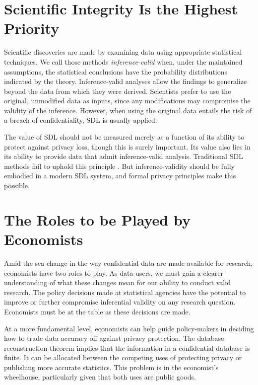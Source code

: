 \documentclass[dvipsnames,finalmode,PP]{AEA}
\begin{document}
\section{Scientific Integrity Is the Highest Priority}

Scientific discoveries are made by examining data using appropriate statistical techniques. We call those methods \emph{inference-valid} when, under the maintained assumptions, the statistical conclusions have the probability distributions indicated by the theory. Inference-valid analyses allow the findings to generalize beyond the data from which they were derived. Scientists prefer to use the original, unmodified data as inputs, since any modifications may compromise the validity of the inference. However, when using the original data entails the risk of a breach of confidentiality, \ac{SDL} is usually applied.

The value of \ac{SDL} should not be measured merely as a function of its ability to protect against privacy loss, though this is surely important. Its value also lies in its ability to provide data that admit inference-valid analysis. Traditional \ac{SDL} methods fail to uphold this principle \citep{abowd:schmutte:BPEA:2015}.
But inference-validity should be fully embodied in a modern \ac{SDL} system, and formal privacy principles make this possible.

\section{The Roles to be Played by Economists}

Amid the sea change in the way confidential data are made available for research, economists have two roles to play. As data users, we must gain a clearer understanding of what these changes mean for our ability to conduct valid research. The policy decisions made at statistical agencies have the potential to improve or further compromise inferential validity on any research question. Economists must be at the table as these decisions are made.

At a more fundamental level, economists can help guide policy-makers in deciding how to trade data accuracy off against privacy protection. The database reconstruction theorem implies that the information in a confidential database is finite. It can be allocated between the competing uses of protecting privacy or publishing more accurate statistics. This problem is in the economist's wheelhouse, particularly given that both uses are public goods.
\end{document}
